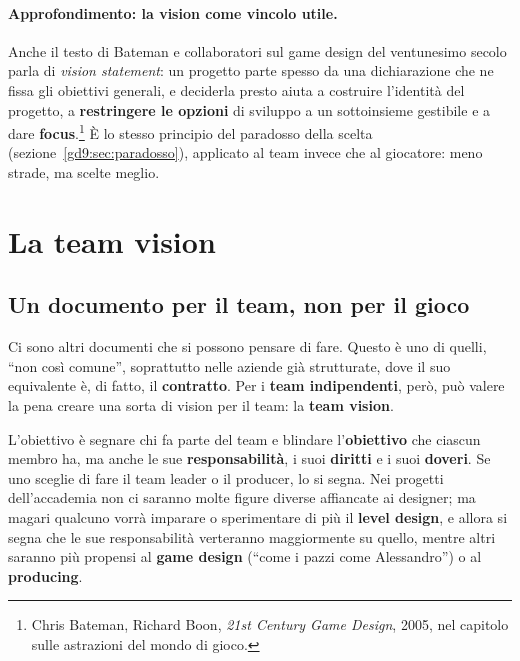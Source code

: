 \paragraph{Approfondimento: la vision come vincolo utile.} Anche il testo di
Bateman e collaboratori sul game design del ventunesimo secolo parla di
\emph{vision statement}: un progetto parte spesso da una dichiarazione che ne
fissa gli obiettivi generali, e deciderla presto aiuta a costruire
l'identità del progetto, a \textbf{restringere le opzioni} di sviluppo a un
sottoinsieme gestibile e a dare \textbf{focus}.\footnote{Chris Bateman,
Richard Boon, \emph{21st Century Game Design}, 2005, nel capitolo sulle
astrazioni del mondo di gioco.} È lo stesso principio del paradosso della
scelta (sezione~\ref{gd9:sec:paradosso}), applicato al team invece che al
giocatore: meno strade, ma scelte meglio.

\section{La team vision}
\label{gd9:sec:team-vision}



\subsection{Un documento per il team, non per il gioco}

Ci sono altri documenti che si possono pensare di fare. Questo è uno di
quelli, ``non così comune'', soprattutto nelle aziende già strutturate, dove
il suo equivalente è, di fatto, il \textbf{contratto}. Per i \textbf{team
indipendenti}, però, può valere la pena creare una sorta di vision per il
team: la \textbf{team vision}.

L'obiettivo è segnare chi fa parte del team e blindare l'\textbf{obiettivo}
che ciascun membro ha, ma anche le sue \textbf{responsabilità}, i suoi
\textbf{diritti} e i suoi \textbf{doveri}. Se uno sceglie di fare il team
leader o il producer, lo si segna. Nei progetti dell'accademia non ci saranno
molte figure diverse affiancate ai designer; ma magari qualcuno vorrà
imparare o sperimentare di più il \textbf{level design}, e allora si segna che
le sue responsabilità verteranno maggiormente su quello, mentre altri saranno
più propensi al \textbf{game design} (``come i pazzi come Alessandro'') o al
\textbf{producing}.

